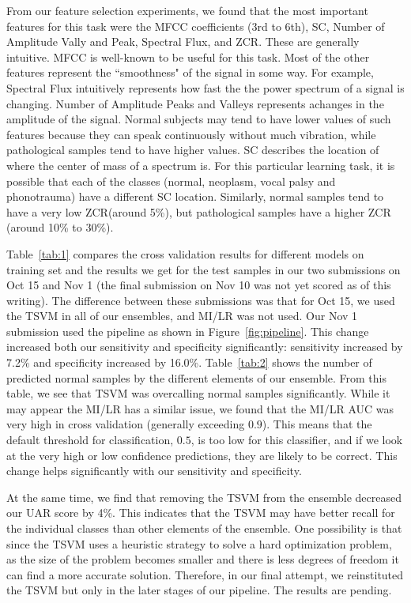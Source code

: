 From our feature selection experiments, we found that the most important features for this task were the MFCC coefficients (3rd to 6th), SC, Number of Amplitude Vally and Peak, Spectral Flux, and ZCR. These are generally intuitive. MFCC is well-known to be useful for this task. Most of the other features represent the ``smoothness" of the signal in some way. For example, Spectral Flux intuitively represents how fast the the power spectrum of a signal is changing. Number of Amplitude Peaks and Valleys represents achanges in the amplitude of the signal. Normal subjects may tend to have lower values of such features because they can speak continuously without much vibration, while pathological samples tend to have higher values. 	SC describes the location of where the center of mass of a spectrum is. For this particular learning task, it is possible that each of the classes (normal, neoplasm, vocal palsy and phonotrauma) have a different SC location. Similarly,  normal samples tend to have a very low ZCR(around 5\%), but pathological samples have a higher ZCR (around 10\% to 30\%).

Table~\ref{tab:1} compares the cross validation results for different models on training set and the results we get for the test samples in our two submissions on Oct 15 and Nov 1 (the final submission on Nov 10 was not yet scored as of this writing). The difference between these submissions was that for Oct 15, we used the TSVM in all of our ensembles, and MI/LR was not used. Our Nov 1 submission used the pipeline as shown in Figure~\ref{fig:pipeline}. This change increased both our sensitivity and specificity significantly: sensitivity increased by 7.2\% and specificity increased by 16.0\%.  Table~\ref{tab:2} shows the number of predicted normal samples by the different elements of our ensemble. From this table, we see that TSVM was overcalling normal samples significantly. While it may appear the MI/LR has a similar issue, we found that the MI/LR AUC was very high in cross validation (generally exceeding $0.9$). This means that the default threshold for classification, $0.5$, is too low for this classifier, and if we look at the very high or low confidence predictions, they are likely to be correct. This change helps significantly with our sensitivity and specificity.

At the same time, we find that removing the TSVM from the ensemble decreased our UAR score by 4\%. This indicates that the TSVM may have better recall for the individual classes than other elements of the ensemble. One possibility is that since the TSVM uses a heuristic strategy to solve a hard optimization problem, as the size of the problem becomes smaller and there is less degrees of freedom it can find a more accurate solution. Therefore, in our final attempt, we reinstituted the TSVM but only in the later stages of our pipeline. The results are pending.

